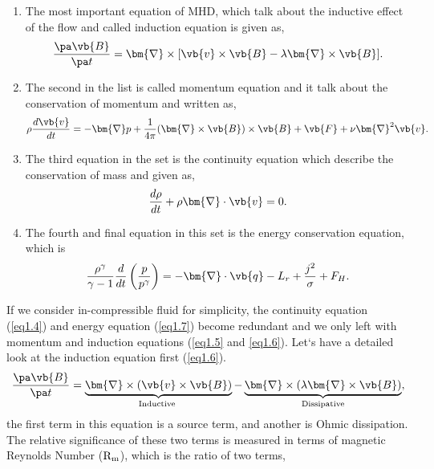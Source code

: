 \begin{enumerate}
    \item The most important equation of MHD, which talk about the inductive effect of the flow and called induction equation is given as,
\begin{equation}
     \frac{\pa\vb{B}}{\pa t}=\bm{\nabla}\times[\vb{v}\times\vb{B}-\lambda\bm{\nabla}\times\vb{B}]. \label{eq1.6}
\end{equation}
    \item The second in the list is called momentum equation and it talk about the conservation of momentum and written as,
\begin{equation}
    \rho\frac{d\vb{v}}{dt}=-\bm{\nabla}p+\frac{1}{4\pi}(\bm{\nabla}\times\vb{B})\times \vb{B}+\vb{F}+\nu\bm{\nabla}^2\vb{v}.   \label{eq1.5}
\end{equation}
    \item The third equation in the set is the continuity equation which describe the conservation of mass and given as,
\begin{equation}
    \frac{d\rho}{dt}+ \rho\bm{\nabla}\cdot\vb{v}=0.
    \label{eq1.4}
\end{equation}
    \item The fourth and final equation in this set is the energy conservation equation, which is
\begin{equation}
     \frac{\rho^\gamma}{\gamma-1}\frac{d}{dt}\left( \frac{p}{p^\gamma}\right)=-\bm{\nabla}\cdot\vb{q}-L_r+\frac{j^2}{\sigma}+F_H.
    \label{eq1.7}
\end{equation}
\end{enumerate}
If we consider in-compressible fluid for simplicity, the continuity equation (\autoref{eq1.4}) and energy equation (\autoref{eq1.7}) become redundant and we only left with momentum and induction equations (\autoref{eq1.5} and \ref{eq1.6}). Let`s have a detailed look at the induction equation first (\autoref{eq1.6}).
\begin{equation}
    \frac{\pa\vb{B}}{\pa t}=\underbrace{\bm{\nabla}\times(\vb{v}\times\vb{B})}_{\text{Inductive }}-\underbrace{\bm{\nabla}\times(\lambda\bm{\nabla}\times\vb{B})}_{\text{Dissipative}}, \label{eq1.8}
\end{equation}
the first term in this equation is a source term, and another is Ohmic dissipation. The relative significance of these two terms is measured in terms of magnetic Reynolds Number (${\rm R_m}$), which is the ratio of two terms,
